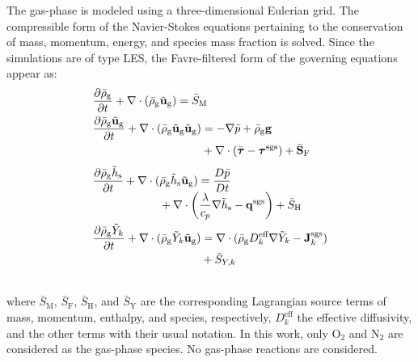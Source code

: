 \documentclass[twocolumn,9pt]{article} %
\newcommand{\mrm}[1]{\mathrm{#1}}
\begin{document}
The gas-phase is modeled using a three-dimensional Eulerian grid. The compressible form of the Navier-Stokes equations pertaining to the conservation of mass, momentum, energy, and species mass fraction is solved. Since the simulations are of type LES, the Favre-filtered form of the governing equations appear as:
\begin{align}
    &\frac{\partial \bar{\rho}_\mrm{g}}{\partial t} + \nabla \cdot (\bar{\rho}_\mrm{g} \tilde{\mathbf{u}}_\mrm{g}) = \bar{S}_{\text{M}} \\
    &\frac{\partial \bar{\rho}_\mrm{g} \tilde{\mathbf{u}}_\mrm{g}}{\partial t} + \nabla \cdot (\bar{\rho}_\mrm{g} \tilde{\mathbf{u}}_\mrm{g} \tilde{\mathbf{u}}_\mrm{g}) = -\nabla \bar{p} + \bar{\rho}_\mrm{g} \mathbf{g}  \\[-0.5em]
    &\phantom{\frac{\partial \bar{\rho}_\mrm{g} \tilde{\mathbf{u}}_\mrm{g}}{\partial t} + \nabla \cdot (\bar{\rho}_\mrm{g} \tilde{\mathbf{u}}_\mrm{g} \tilde{\mathbf{u}}_\mrm{g})} + \nabla \cdot (\bar{\boldsymbol{\tau}} - \boldsymbol{\tau}^{\text{sgs}}) + \bar{\mathbf{S}}_{\text{F}} \notag\\
    &\frac{\partial \bar{\rho}_\mrm{g} \tilde{h}_{\text{s}}}{\partial t} + \nabla \cdot (\bar{\rho}_\mrm{g} \tilde{h}_{\text{s}} \tilde{\mathbf{u}}_\mrm{g}) = \frac{D\bar{p}}{Dt}  \\[-0.5em]
    &\phantom{\frac{\partial \bar{\rho}_\mrm{g} \tilde{h}_{\text{s}}}{\partial t} + \bar{\rho}_\mrm{g} \tilde{h}_{\text{s}}}+ \nabla \cdot \left( \frac{\lambda}{c_p} \nabla \tilde{h}_{\text{s}} - \mathbf{q}^{\text{sgs}} \right) + \bar{S}_{\text{H}} \notag\\
    &\frac{\partial \bar{\rho}_\mrm{g} \tilde{Y}_k}{\partial t} + \nabla \cdot (\bar{\rho}_\mrm{g} \tilde{Y}_k \tilde{\mathbf{u}}_\mrm{g}) = \nabla \cdot (\bar{\rho}_\mrm{g} D_k^{\text{eff}} \nabla \tilde{Y}_k - \mathbf{J}_k^{\text{sgs}}) \notag \\[-0.75em]
    &\phantom{\frac{\partial \bar{\rho}_\mrm{g} \tilde{Y}_k}{\partial t} + \nabla \cdot (\bar{\rho}_\mrm{g} \tilde{Y}_k \tilde{\mathbf{u}}_\mrm{g})}+ \bar{S}_{Y,k}
\end{align}\\[-6pt]
where $\bar{S}_{\text{M}}$, $\bar{S}_{\text{F}}$, $\bar{S}_{\text{H}}$, and $\bar{S}_{\text{Y}}$ are the corresponding Lagrangian source terms of mass, momentum, enthalpy, and species, respectively, $D_k^{\mathrm{eff}}$ the effective diffusivity, and the other terms with their usual notation. In this work, only $\mrm{O_2}$ and $\mrm{N_2}$ are considered as the gas-phase species. No gas-phase reactions are considered.
\end{document}
